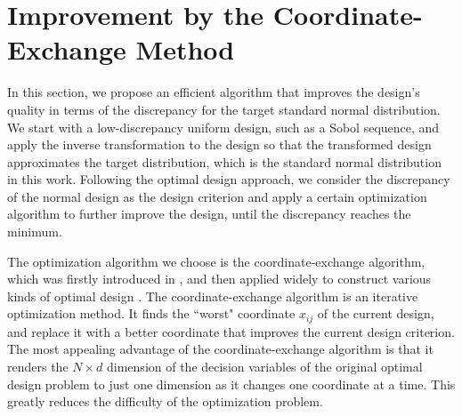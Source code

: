 \documentclass[graybox]{svmult}
\begin{document}
\section{Improvement by the Coordinate-Exchange Method}\label{sec:CoordEx}

In this section, we propose an efficient algorithm that improves the design's quality in terms of the discrepancy for the target standard normal distribution. 
We start with a low-discrepancy uniform design, such as a Sobol sequence, and apply the inverse transformation to the design so that the transformed design approximates the target distribution, which is the standard normal distribution in this work. 
Following the optimal design approach, we consider the discrepancy of the normal design as the design criterion and apply a certain optimization algorithm to further improve the design, until the discrepancy reaches the minimum.

The optimization algorithm we choose is the coordinate-exchange algorithm, which was firstly introduced in \cite{meyer1995coordinate}, and then applied widely to construct various kinds of optimal design \cite{sambo2014coordinate,overstall2017bayesian,kang2018stochastic}. 
The coordinate-exchange algorithm is an iterative optimization method.
It finds the ``worst" coordinate $x_{ij}$ of the current design, and replace it with a better coordinate that improves the current design criterion. 
The most appealing advantage of the coordinate-exchange algorithm is that it renders the $N\times d$ dimension of the decision variables of the original optimal design problem to just one dimension as it changes one coordinate at a time. 
This greatly reduces the difficulty of the optimization problem. 
\end{document}
